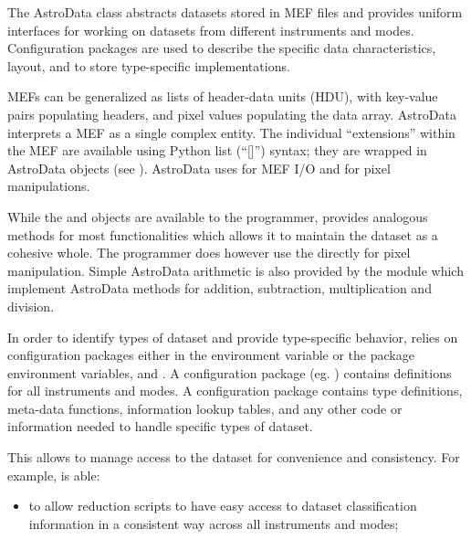\documentclass[letterpaper,10pt,english]{sphinxmanual}
\begin{document}
\begin{fulllineitems}
\label{chapter_AstroDataClass:astrodata.data.AstroData}
The AstroData class abstracts datasets stored in MEF files
and provides uniform interfaces for working on datasets from different
instruments and modes.  Configuration packages are used to describe
the specific data characteristics, layout, and to store type-specific
implementations.

MEFs can be generalized as lists of header-data units (HDU), with key-value 
pairs populating headers, and pixel values populating the data array.
AstroData interprets a MEF as a single complex entity.  The individual
``extensions'' within the MEF are available using Python list (``{[}{]}'') syntax; 
they are wrapped in AstroData objects (see 
{\hyperref[chapter_AstroDataClass:astrodata.data.AstroData.__getitem__]{}}). 
AstroData uses  for MEF I/O and  for pixel manipulations.

While the  and  objects are available to the programmer, 
 provides analogous methods for most  functionalities 
which allows it to maintain the dataset  as a cohesive whole. The programmer 
does however use the  directly for pixel manipulation.
Simple AstroData arithmetic is also provided by the  
module which implement AstroData methods for addition, subtraction, multiplication 
and division.

In order to identify types of dataset and provide type-specific behavior,
 relies on configuration packages either in the  environment
variable or the  package environment variables,  and
. A configuration package (eg. ) contains definitions for
all instruments and modes. A configuration package contains type
definitions, meta-data functions, information lookup tables, and any other code
or information needed to handle specific types of dataset.

This allows  to manage access to the dataset for convenience and
consistency. For example,  is able:
\begin{itemize}
\item {} 
to allow reduction scripts to have easy access to dataset classification 
information in a consistent way across all instruments and modes;


\end{itemize}
\end{fulllineitems}
\end{document}
